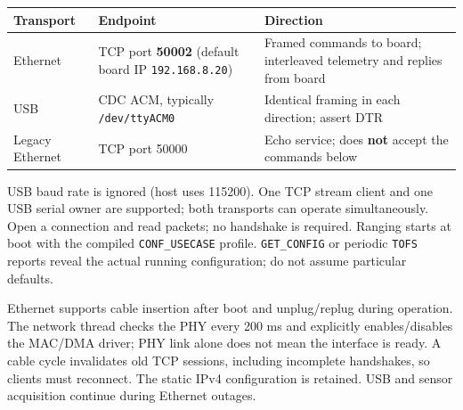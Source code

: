 \documentclass[10pt,a4paper,oneside]{report}
\begin{document}
{\def\LTcaptype{none} %
\begin{longtable}[]{@{}
  >{\raggedright\arraybackslash}p{}
  >{\raggedright\arraybackslash}p{}
  >{\raggedright\arraybackslash}p{}@{}}
\toprule\noalign{}
\begin{minipage}[b]{\linewidth}\raggedright
\textbf{Transport}
\end{minipage} & \begin{minipage}[b]{\linewidth}\raggedright
\textbf{Endpoint}
\end{minipage} & \begin{minipage}[b]{\linewidth}\raggedright
\textbf{Direction}
\end{minipage} \\
\midrule\noalign{}
\endhead
\bottomrule\noalign{}
\endlastfoot
Ethernet & TCP port \textbf{50002} (default board IP \texttt{192.\allowbreak{}168.\allowbreak{}8.\allowbreak{}20}) & Framed commands to board; interleaved telemetry and replies from board \\
USB & CDC ACM, typically \texttt{/\allowbreak{}dev/\allowbreak{}ttyACM0} & Identical framing in each direction; assert DTR \\
Legacy Ethernet & TCP port 50000 & Echo service; does \textbf{not} accept the commands below \\
\end{longtable}
}

USB baud rate is ignored (host uses 115200). One TCP stream client and one USB serial owner are supported; both transports can operate simultaneously. Open a connection and read packets; no handshake is required. Ranging starts at boot with the compiled \texttt{CONF\_\allowbreak{}USECASE} profile. \texttt{GET\_\allowbreak{}CONFIG} or periodic \texttt{TOFS} reports reveal the actual running configuration; do not assume particular defaults.

Ethernet supports cable insertion after boot and unplug/replug during operation. The network thread checks the PHY every 200 ms and explicitly enables/disables the MAC/DMA driver; PHY link alone does not mean the interface is ready. A cable cycle invalidates old TCP sessions, including incomplete handshakes, so clients must reconnect. The static IPv4 configuration is retained. USB and sensor acquisition continue during Ethernet outages.
\end{document}
